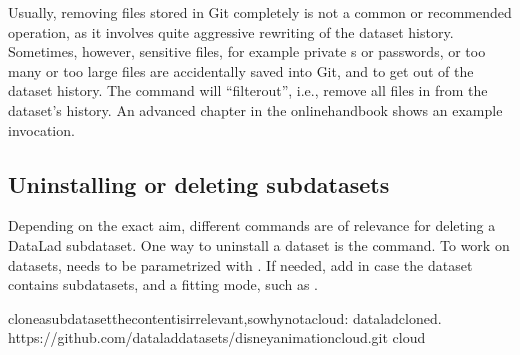\sphinxAtStartPar
Usually, removing files stored in Git completely
is not a common or recommended operation, as it involves quite aggressive
rewriting of the dataset history. Sometimes, however, sensitive files, for example
private {\hyperref[\detokenize{glossary:term-SSH-key}]{}}s or passwords, or too many or too large files are
accidentally saved into Git, and  to get out of the dataset history.
The command  will “filter\sphinxhyphen{}out”,
i.e., remove all files  in 
from the dataset’s history. An advanced chapter in the online\sphinxhyphen{}handbook
shows an example invocation.

\ignorespaces 

\subsection{Uninstalling or deleting subdatasets}
\label{\detokenize{basics/101-136-filesystem:uninstalling-or-deleting-subdatasets}}\label{\detokenize{basics/101-136-filesystem:index-9}}
\sphinxAtStartPar
Depending on the exact aim, different commands are of relevance for
deleting a DataLad subdataset.
One way to uninstall a dataset is the  command.
To work on datasets,  needs to be parametrized with .
If needed, add  in case the dataset contains subdatasets, and a
fitting  mode, such as .

\begin{sphinxVerbatim}[commandchars=\\\{\}]
cloneasubdataset\PYGZhy{}thecontentisirrelevant,sowhynotacloud:
dataladclone\PYGZhy{}d.
https://github.com/datalad\PYGZhy{}datasets/disneyanimation\PYGZhy{}cloud.git
cloud
\end{sphinxVerbatim}

